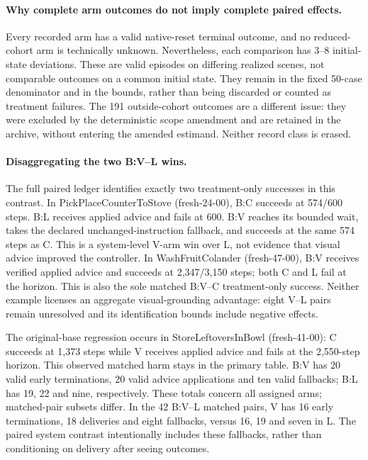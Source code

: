 \paragraph{Why complete arm outcomes do not imply complete paired effects.}
Every recorded arm has a valid native-reset terminal outcome, and no reduced-cohort arm is technically unknown. Nevertheless, each comparison has 3--8 initial-state deviations. These are valid episodes on differing realized scenes, not comparable outcomes on a common initial state. They remain in the fixed 50-case denominator and in the bounds, rather than being discarded or counted as treatment failures. The 191 outside-cohort outcomes are a different issue: they were excluded by the deterministic scope amendment and are retained in the archive, without entering the amended estimand. Neither record class is erased.

\paragraph{Disaggregating the two B:V--L wins.}
The full paired ledger identifies exactly two treatment-only successes in this contrast. In PickPlaceCounterToStove (fresh-24-00), B:C succeeds at 574/600 steps. B:L receives applied advice and fails at 600. B:V reaches its bounded wait, takes the declared unchanged-instruction fallback, and succeeds at the same 574 steps as C. This is a system-level V-arm win over L, not evidence that visual advice improved the controller. In WashFruitColander (fresh-47-00), B:V receives verified applied advice and succeeds at 2,347/3,150 steps; both C and L fail at the horizon. This is also the sole matched B:V--C treatment-only success. Neither example licenses an aggregate visual-grounding advantage: eight V--L pairs remain unresolved and its identification bounds include negative effects.

The original-base regression occurs in StoreLeftoversInBowl (fresh-41-00): C succeeds at 1,373 steps while V receives applied advice and fails at the 2,550-step horizon. This observed matched harm stays in the primary table. B:V has 20 valid early terminations, 20 valid advice applications and ten valid fallbacks; B:L has 19, 22 and nine, respectively. These totals concern all assigned arms; matched-pair subsets differ. In the 42 B:V--L matched pairs, V has 16 early terminations, 18 deliveries and eight fallbacks, versus 16, 19 and seven in L. The paired system contrast intentionally includes these fallbacks, rather than conditioning on delivery after seeing outcomes.


